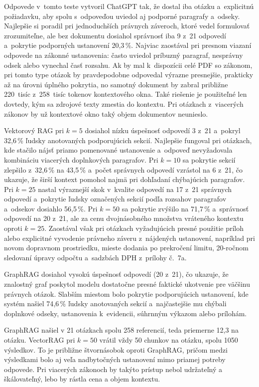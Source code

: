 Odpovede v~tomto teste vytvoril ChatGPT tak, že dostal iba otázku a~explicitnú požiadavku, aby spolu s~odpoveďou uviedol aj podporné paragrafy a~odseky. Najlepšie si poradil pri jednoduchších právnych záveroch, ktoré vedel formulovať zrozumiteľne, ale bez dokumentu dosiahol správnosť iba 9 z~21 odpovedí a~pokrytie podporných ustanovení 20{,}3\,\%. Najviac zaostával pri presnom viazaní odpovede na zákonné ustanovenia: často uviedol príbuzný paragraf, nesprávny odsek alebo vynechal časť rozsahu. Ak by mal k~dispozícii celé PDF so zákonom, pri tomto type otázok by pravdepodobne odpovedal výrazne presnejšie, prakticky až na úrovni úplného pokrytia, no samotný dokument by zabral približne 220~tisíc z~258~tisíc tokenov kontextového okna. Také riešenie je použiteľné len dovtedy, kým sa zdrojové texty zmestia do kontextu. Pri otázkach z~viacerých zákonov by už kontextové okno taký objem dokumentov neunieslo.

Vektorový RAG pri $k=5$ dosiahol nízku úspešnosť odpovedí 3 z~21 a~pokryl 32{,}6\,\% ľudsky anotovaných podporujúcich sekcií. Najlepšie fungoval pri otázkach, kde stačilo nájsť priamo pomenované ustanovenie a~odpoveď nevyžadovala kombináciu viacerých doplnkových paragrafov. Pri $k=10$ sa pokrytie sekcií zlepšilo z~32{,}6\,\% na 43{,}5\,\% a~počet správnych odpovedí vzrástol na 6 z~21, čo ukazuje, že širší kontext pomohol najmä pri dohľadaní chýbajúcich paragrafov. Pri $k=25$ nastal výraznejší skok v~kvalite odpovedí na 17 z~21 správnych odpovedí a~pokrytie ľudsky označených sekcií podľa rozsahov paragrafov a~odsekov dosiahlo 56{,}5\,\%. Pri $k=50$ sa pokrytie zvýšilo na 71{,}7\,\% a~správnosť odpovedí na 20 z~21, ale za cenu dvojnásobného množstva vráteného kontextu oproti $k=25$. Zaostával však pri otázkach vyžadujúcich presné použitie príloh alebo explicitné vyvodenie právneho záveru z~nájdených ustanovení, napríklad pri novom dopravnom prostriedku, mieste dodania po prekročení limitu, 20-ročnom sledovaní úpravy odpočtu a~sadzbách DPH z~prílohy č.~7a.

GraphRAG dosiahol vysokú úspešnosť odpovedí (20 z~21), čo ukazuje, že znalostný graf poskytol modelu dostatočne presné faktické ukotvenie pre väčšinu právnych otázok. Slabším miestom bolo pokrytie podporujúcich ustanovení, kde systém našiel 74{,}6\,\% ľudsky anotovaných sekcií a~najčastejšie mu chýbali doplnkové odseky, ustanovenia k~evidencii, súhrnným výkazom alebo prílohám.

GraphRAG našiel v 21 otázkach spolu 258 referencií, teda priemerne 12,3 na otázku. VectorRAG pri $k=50$ vrátil vždy 50 chunkov na otázku, spolu 1050 výsledkov. To je približne štvornásobok oproti GraphRAG, pričom medzi výsledkami bolo aj veľa nadbytočných ustanovení mimo priamej potreby odpovede. Pri viacerých zákonoch by takýto prístup nebol udržateľný a škálovateľný, lebo by rástla cena a objem kontextu. 


